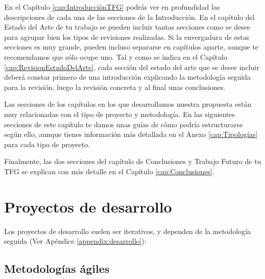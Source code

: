 En el Capítulo \ref{cap:IntroducciónTFG} podrás ver en profundidad las descripciones de cada una de las secciones de la Introducción.
En el capítulo del Estado del Arte de tu trabajo se pueden incluir tantas secciones como se desee para agrupar bien los tipos de revisiones realizadas. Si la envergadura de estas secciones es muy grande, pueden incluso separarse en capítulos aparte, aunque te recomendamos que sólo ocupe uno. Tal y como se indica en el Capítulo \ref{cap:RevisionEstadoDelArte}, cada sección del estado del arte que se desee incluir deberá constar primero de una introducción explicando la metodología seguida para la revisión, luego la revisión concreta y al final unas conclusiones. %

Las secciones de los capítulos en los que desarrollamos nuestra propuesta están muy relacionadas con el tipo de proyecto y metodología. En las siguientes secciones de este capítulo te damos unas guías de cómo podría estructurarse según ello, aunque tienes información más detallada en el Anexo \ref{cap:Tipologías} para cada tipo de proyecto.

Finalmente, las dos secciones del capítulo de Conclusiones y Trabajo Futuro de tu TFG se explican con más detalle en el Capítulo \ref{cap:Conclusiones}.

\section{Proyectos de desarrollo}

Los proyectos de desarrollo suelen ser iterativos, y dependen de la metodología seguida (Ver Apéndice \ref{appendix:desarrollo}):

\subsection{Metodologías ágiles}

